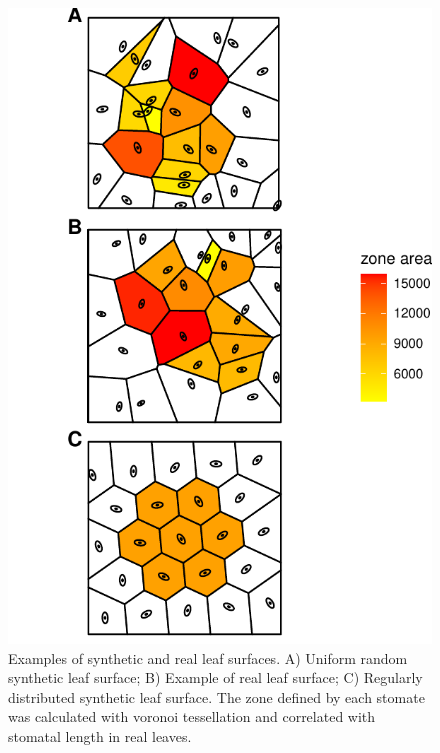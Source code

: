 \documentclass[12pt,halfline,a4paper,]{ouparticle}
\begin{document}
\begin{figure}[ht]
\includegraphics[width = \textwidth]{figures/tessellation-example.pdf}
\caption{Examples of synthetic and real leaf surfaces.  A) Uniform random synthetic leaf surface; B) Example of real leaf surface; C) Regularly distributed synthetic leaf surface. The zone defined by each stomate was calculated with voronoi tessellation and correlated with stomatal length in real leaves.}
\label{fig:example}
\end{figure}
\end{document}

